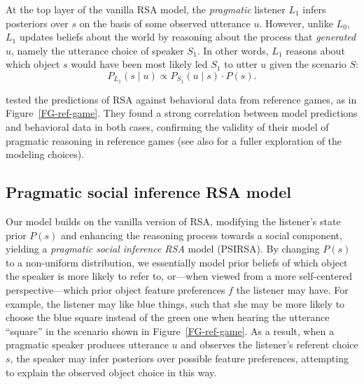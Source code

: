 \documentclass[10pt,a4paper]{article}
\begin{document}
At the top layer of the vanilla RSA model, the \emph{pragmatic} listener $L_1$ infers posteriors over $s$ on the basis of some observed utterance $u$.
However, unlike $L_0$, $L_1$ updates beliefs about the world by reasoning about the process that \emph{generated} $u$, namely the utterance choice of speaker $S_1$.
In other words, $L_1$ reasons about which object $s$ would have been most likely led $S_1$ to utter $u$ given the scenario $S$:
\begin{equation}
P_{L_{1}}(s \mid u) \propto P_{S_{1}}(u \mid s) \cdot P(s).
\end{equation}


 tested the predictions of RSA against behavioral data from reference games, as in Figure~\ref{FG-ref-game}.
They found a strong correlation between model predictions and behavioral data in both cases, confirming the validity of their model of pragmatic reasoning in reference games (see also  for a fuller exploration of the modeling choices).


\subsection{Pragmatic social inference RSA model}

Our model builds on the vanilla version of RSA, modifying the listener's state prior $P(s)$ and enhancing the reasoning process towards a social component, yielding a \emph{pragmatic social inference RSA} model (PSIRSA). %
By changing $P(s)$ to a non-uniform distribution, we essentially model prior beliefs of which object the speaker is more likely to refer to, or---when viewed from a more self-centered perspective---which prior object feature preferences $f$ the listener may have. 
For example, the listener may like blue things, such that she may be more likely to choose the blue square instead of the green one when hearing the utterance ``square'' in the scenario shown in Figure~\ref{FG-ref-game}.
As a result, when a pragmatic speaker produces utterance $u$ and observes the listener's referent choice $s$, the speaker may infer posteriors over possible feature preferences, attempting to explain the observed object choice in this way.
\end{document}
